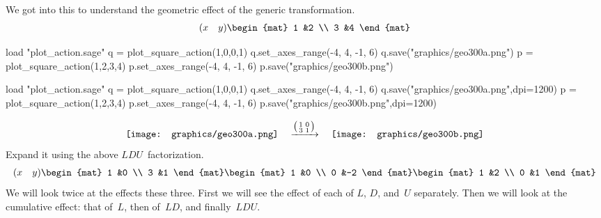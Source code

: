 We got into this to understand 
the geometric effect of the generic transformation.
\begin{equation*}
  \rowvec{x &y}
  \begin{mat}
   1 &2 \\
   3 &4 
  \end{mat}
\end{equation*}
\begin{sageoutput}[d,0,4;d,5,7]
load "plot_action.sage"
q = plot_square_action(1,0,0,1) 
q.set_axes_range(-4, 4, -1, 6) 
q.save("graphics/geo300a.png")
p = plot_square_action(1,2,3,4) 
p.set_axes_range(-4, 4, -1, 6) 
p.save("graphics/geo300b.png")
\end{sageoutput}
\begin{sagesilent}
load "plot_action.sage"
q = plot_square_action(1,0,0,1) 
q.set_axes_range(-4, 4, -1, 6) 
q.save("graphics/geo300a.png",dpi=1200)
p = plot_square_action(1,2,3,4) 
p.set_axes_range(-4, 4, -1, 6) 
p.save("graphics/geo300b.png",dpi=1200)
\end{sagesilent}
\begin{equation*}
  \vcenteredhbox{\texttt{[image: graphics/geo300a.png]}}
  \quad\mapsvia{\big (\begin{smallmatrix} 1 &0 \\ 3 &1 \end{smallmatrix}\big )}\quad
  \vcenteredhbox{\texttt{[image: graphics/geo300b.png]}}
\end{equation*}
\noindent Expand it using the above $LDU$~factorization. 
\begin{equation*}
  \rowvec{x &y}
  \begin{mat}
   1 &0 \\
   3 &1 
  \end{mat}
  \begin{mat}
    1 &0 \\
    0 &-2
  \end{mat}
  \begin{mat}
    1 &2 \\
    0 &1
  \end{mat}  
\end{equation*}
We will look twice at the effects these three.
First we will see the effect of each of $L$, $D$, and~$U$ separately.
Then we will look at the cumulative effect: that of~$L$, then of~$LD$, 
and finally~$LDU$.

